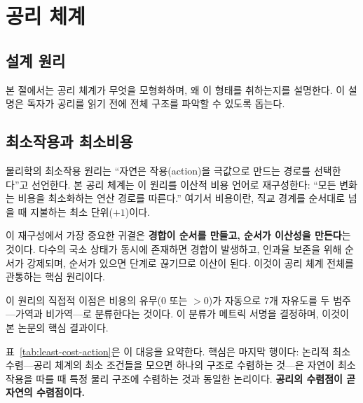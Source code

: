 \documentclass[entropy,article,submit,pdftex,oneauthor]{Definitions/mdpi}
\begin{document}
\section{공리 체계}
\label{sec:axioms}

\subsection{설계 원리}
\label{sec:framework}

본 절에서는 공리 체계가 무엇을 모형화하며, 왜 이 형태를 취하는지를 설명한다. 이 설명은 독자가 공리를 읽기 전에 전체 구조를 파악할 수 있도록 돕는다.

\subsection{최소작용과 최소비용}

물리학의 최소작용 원리는 ``자연은 작용(action)을 극값으로 만드는 경로를 선택한다''고 선언한다. 본 공리 체계는 이 원리를 이산적 비용 언어로 재구성한다: ``모든 변화는 비용을 최소화하는 연산 경로를 따른다.'' 여기서 비용이란, 직교 경계를 순서대로 넘을 때 지불하는 최소 단위($+1$)이다.

이 재구성에서 가장 중요한 귀결은 \textbf{경합이 순서를 만들고, 순서가 이산성을 만든다}는 것이다. 다수의 국소 상태가 동시에 존재하면 경합이 발생하고, 인과율 보존을 위해 순서가 강제되며, 순서가 있으면 단계로 끊기므로 이산이 된다. 이것이 공리 체계 전체를 관통하는 핵심 원리이다.

이 원리의 직접적 이점은 비용의 유무($0$ 또는 $>0$)가 자동으로 7개 자유도를 두 범주---가역과 비가역---로 분류한다는 것이다. 이 분류가 메트릭 서명을 결정하며, 이것이 본 논문의 핵심 결과이다.

표~\ref{tab:least-cost-action}은 이 대응을 요약한다. 핵심은 마지막 행이다: 논리적 최소 수렴---공리 체계의 최소 조건들을 모으면 하나의 구조로 수렴하는 것---은 자연이 최소 작용을 따를 때 특정 물리 구조에 수렴하는 것과 동일한 논리이다. \textbf{공리의 수렴점이 곧 자연의 수렴점이다.}
\end{document}
